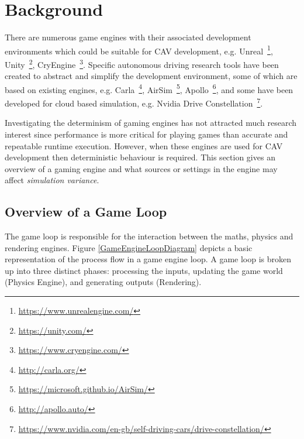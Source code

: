 






\section{Background} \label{s:background}

There are numerous game engines with their associated development environments which could be suitable for CAV development, e.g. Unreal~\footnote{\url{https://www.unrealengine.com/}}, Unity~\footnote{\url{https://unity.com/}}, CryEngine~\footnote{\url{https://www.cryengine.com/}}. Specific autonomous driving research tools have been created to abstract and simplify the development environment, some of which are based on existing engines, e.g. Carla~\footnote{\url{http://carla.org/}}, AirSim~\footnote{\url{https://microsoft.github.io/AirSim/}}, Apollo~\footnote{\url{http://apollo.auto/}}, and some have been developed for cloud based simulation, e.g. Nvidia Drive Constellation~\footnote{\url{https://www.nvidia.com/en-gb/self-driving-cars/drive-constellation/}}.

Investigating the determinism of gaming engines has not attracted much research interest since performance is more critical for playing games than accurate and repeatable runtime execution. However, when these engines are used for CAV development then deterministic behaviour is required. This section gives an overview of a gaming engine and what sources or settings in the engine may affect \textit{simulation variance}.
%

\subsection{Overview of a Game Loop} \label{GameLoopSection}
The game loop is responsible for the interaction between the maths, physics and rendering engines. Figure \ref{GameEngineLoopDiagram} depicts a basic representation of the process flow in a game engine loop. A game loop is broken up into three distinct phases: processing the inputs, updating the game world (Physics Engine), and generating outputs (Rendering).~\cite{GameEngineArchBook}

